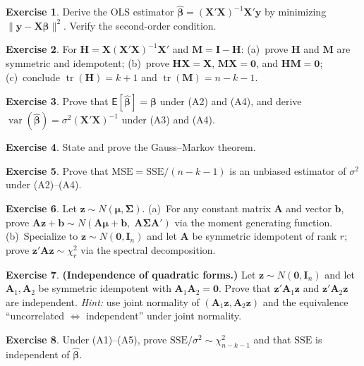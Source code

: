 \documentclass[12pt,a4paper]{article}
\theoremstyle{definition}
\newtheorem{exercise}{Exercise}
\newcommand\expc{\mathsf{E}}
\DeclareMathOperator\var{var}
\DeclareMathOperator\tr{tr}
\newcommand{\SSE}{\mathrm{SSE}}
\newcommand{\MSE}{\mathrm{MSE}}
\newcommand{\bX}{\mathbf{X}}
\newcommand{\by}{\mathbf{y}}
\def\bb{\boldsymbol{\beta}}
\newcommand{\bI}{\mathbf{I}}
\newcommand{\bH}{\mathbf{H}}
\newcommand{\bM}{\mathbf{M}}
\newcommand{\bzero}{\mathbf{0}}
\newcommand{\bz}{\mathbf{z}}
\newcommand{\bA}{\mathbf{A}}
\begin{document}
\begin{exercise}\label{ex:A3}
Derive the OLS estimator $\hat{\bb} = (\bX'\bX)^{-1}\bX'\by$ by minimizing $\|\by - \bX\bb\|^2$. Verify the second-order condition.
\end{exercise}

\begin{exercise}\label{ex:A4}
For $\bH = \bX(\bX'\bX)^{-1}\bX'$ and $\bM = \bI - \bH$: (a)~prove $\bH$ and $\bM$ are symmetric and idempotent; (b)~prove $\bH\bX = \bX$, $\bM\bX = \bzero$, and $\bH\bM = \bzero$; (c)~conclude $\tr(\bH) = k+1$ and $\tr(\bM) = n-k-1$.
\end{exercise}

\begin{exercise}\label{ex:A5}
Prove that $\expc[\hat{\bb}] = \bb$ under (A2) and (A4), and derive $\var(\hat{\bb}) = \sigma^2(\bX'\bX)^{-1}$ under (A3) and (A4).
\end{exercise}

\begin{exercise}\label{ex:A6}
State and prove the Gauss--Markov theorem.
\end{exercise}

\begin{exercise}\label{ex:A7}
Prove that $\MSE = \SSE/(n-k-1)$ is an unbiased estimator of $\sigma^2$ under (A2)--(A4).
\end{exercise}

\begin{exercise}\label{ex:A8}
Let $\bz \sim N(\boldsymbol\mu, \boldsymbol\Sigma)$. (a)~For any constant matrix $\bA$ and vector $\mathbf{b}$, prove $\bA\bz + \mathbf{b} \sim N(\bA\boldsymbol\mu + \mathbf{b},\;\bA\boldsymbol\Sigma\bA')$ via the moment generating function. (b)~Specialize to $\bz \sim N(\bzero, \bI_n)$ and let $\bA$ be symmetric idempotent of rank $r$; prove $\bz'\bA\bz \sim \chi^2_r$ via the spectral decomposition.
\end{exercise}

\begin{exercise}\label{ex:A9}
\textbf{(Independence of quadratic forms.)} Let $\bz \sim N(\bzero, \bI_n)$ and let $\bA_1, \bA_2$ be symmetric idempotent with $\bA_1\bA_2 = \bzero$. Prove that $\bz'\bA_1\bz$ and $\bz'\bA_2\bz$ are independent. \emph{Hint:} use joint normality of $(\bA_1\bz, \bA_2\bz)$ and the equivalence ``uncorrelated $\Leftrightarrow$ independent'' under joint normality.
\end{exercise}

\begin{exercise}\label{ex:A10}
Under (A1)--(A5), prove $\SSE/\sigma^2 \sim \chi^2_{n-k-1}$ and that $\SSE$ is independent of $\hat{\bb}$.
\end{exercise}
\end{document}
